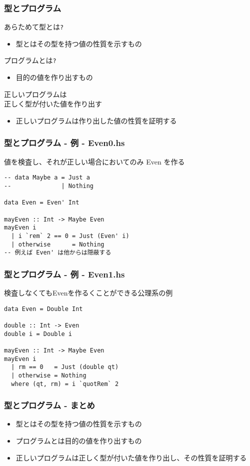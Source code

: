 \documentclass[cjk,dvipdfm,14pt]{beamer}
\begin{document}
\begin{frame}[fragile]
\frametitle{型とプログラム}

あらためて型とは\verb|?|
\begin{itemize}
\item 型とはその型を持つ値の性質を示すもの
\end{itemize}

プログラムとは\verb|?|
\begin{itemize}
\item 目的の値を作り出すもの
\end{itemize}

正しいプログラムは\\正しく型が付いた値を作り出す
\begin{itemize}
\item { \color{red} 正しいプログラムは作り出した値の性質を証明する }
\end{itemize}

\end{frame}

\begin{frame}[fragile]
\frametitle{型とプログラム - 例 - Even0.hs}

値を検査し、それが正しい場合においてのみ Even を作る
\begin{lstlisting}
-- data Maybe a = Just a
--              | Nothing

data Even = Even' Int

mayEven :: Int -> Maybe Even
mayEven i
  | i `rem` 2 == 0 = Just (Even' i)
  | otherwise      = Nothing
-- 例えば Even' は他からは隠蔽する
\end{lstlisting}

\end{frame}

\begin{frame}[fragile]
\frametitle{型とプログラム - 例 - Even1.hs}

検査しなくてもEvenを作るくことができる公理系の例
\begin{lstlisting}
data Even = Double Int

double :: Int -> Even
double i = Double i

mayEven :: Int -> Maybe Even
mayEven i
  | rm == 0   = Just (double qt)
  | otherwise = Nothing
  where (qt, rm) = i `quotRem` 2
\end{lstlisting}

\end{frame}

\begin{frame}[fragile]
\frametitle{型とプログラム - まとめ}

\begin{itemize}
\item 型とはその型を持つ値の性質を示すもの
\item プログラムとは目的の値を作り出すもの
\item 正しいプログラムは正しく型が付いた値を作り出し、その性質を証明する
\end{itemize}

\end{frame}
\end{document}
